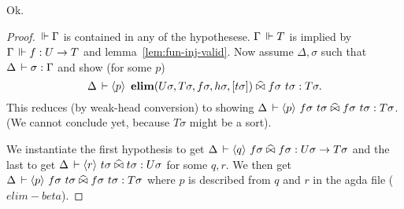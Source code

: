 \documentclass[a4paper,english]{lipics-utf8x}
\begin{document}
  \begin{lemma}
    \leavevmode
    \begin{mathc}
    \end{mathc}
  \end{lemma}
  Ok.

  \begin{lemma}
    \leavevmode
    \begin{mathc}
    \end{mathc}
  \end{lemma}

  \begin{proof}
    $\,\Vdash \Gamma$ is contained in any of the hypothesese.
    $\Gamma \,\Vdash T$ is implied by $\Gamma \,\Vdash f : U \to T$ and
    lemma~\ref{lem:fun-inj-valid}.
    Now assume $\Delta, \sigma$ such that
    $\Delta \,\vdash \sigma : \Gamma$ and
    show (for some $p$)
    \[\Delta \,\vdash \langle p \rangle~
    \operatorname{\mathbf{elim}}(U \sigma,T \sigma,f \sigma,h \sigma,[t \sigma]) \mathrel{\widehat{\bowtie}}
    f \sigma\ t \sigma : T \sigma.\]
    This reduces (by weak-head conversion) to showing
    $\Delta \,\vdash \langle p \rangle~
    f \sigma\ t \sigma \mathrel{\widehat{\bowtie}}
    f \sigma\ t \sigma : T \sigma$.
    (We cannot conclude yet, because $T \sigma$ might be a sort).

    We instantiate the first hypothesis to get
    $\Delta \,\vdash \langle q \rangle~ f \sigma \mathrel{\widehat{\bowtie}} f \sigma : U \sigma \to T \sigma$
    and the last to get
    $\Delta \,\vdash \langle r \rangle~ t \sigma \mathrel{\widehat{\bowtie}} t \sigma : U \sigma$
    for some $q,r$.
    We then get
    $\Delta \,\vdash \langle p \rangle~ f \sigma\ t \sigma \mathrel{\widehat{\bowtie}}
    f \sigma\ t \sigma : T \sigma$
    where $p$ is described from $q$ and $r$ in the agda file ($elim-beta$).
  \end{proof}

  \begin{lemma}
    \leavevmode
    \begin{mathc}
    \end{mathc}
  \end{lemma}
\end{document}
